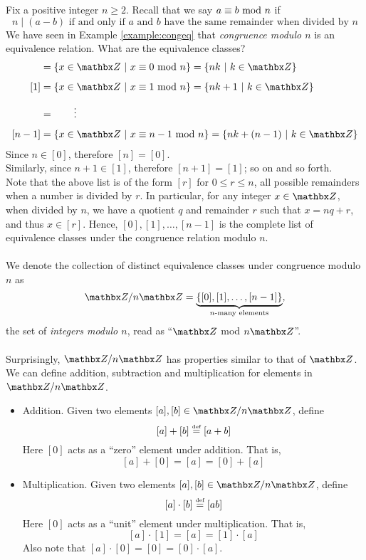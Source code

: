 \begin{discussion}
Fix a positive integer $n \geq 2$. Recall that we say $a \equiv b \text{ mod }{n}$ if 
\[n\mid (a-b) \text{ if and only if $a$ and $b$ have the same remainder when divided by $n$}\]
We have seen in Example \ref{example:congeq} that \emph{congruence modulo $n$} is an equivalence relation. What are the equivalence classes?
\begin{align*}
[0] &= \setp{x \in \zz}{x \equiv 0 \modar{n}} = \setp{nk}{k \in \zz}\\[0.5em]
[1] &= \setp{x \in \zz}{x \equiv 1 \modar{n}} = \setp{nk + 1}{k \in \zz}\\[0.5em]
	&= \qquad \vdots\\[0.5em]
[n-1] &= \setp{x \in \zz}{x \equiv n-1 \modar{n}} = \setp{nk + (n-1)}{k \in \zz}
\end{align*}
Since $n \in [0]$, therefore $[n] = [0]$.\\[0.5em]
Similarly, since $n + 1 \in [1]$, therefore $[n+1] = [1]$; so on and so forth.\\
Note that the above list is of the form $[r]$ for $0 \leq r \leq n$, all possible remainders when a number is divided by $r$. In particular, for any integer $x \in \zz$, when divided by $n$, we have a quotient $q$ and remainder $r$ such that $x = nq + r$, and thus $x \in [r]$. Hence, $[0],[1],\ldots,[n-1]$ is the complete list of equivalence classes under the congruence relation modulo $n$.\\
\\
We denote the collection of distinct equivalence classes under congruence modulo $n$ as
\[\zz/n\zz = \underbrace{\set{[0],[1],\ldots,[n-1]}}_{\text{$n$-many elements}},\]
the set of \emph{integers modulo $n$}, read as ``$\zz$ mod $n\zz$''.\\
\\
Surprisingly, $\zz/n\zz$ has properties similar to that of $\zz$. We can define addition, subtraction and multiplication for elements in $\zz/n\zz$.
\begin{itemize}[leftmargin=*]
\item[]Addition. Given two elements $[a],[b] \in \zz/n\zz$, define
\[ [a] + [b] \overset{\text{\tiny def}}{=} [a+b]\]
Here $[0]$ acts as a ``zero'' element under addition. That is,
\[ [a] + [0] = [a] = [0] + [a]\]

\item[]Multiplication. Given two elements $[a],[b] \in \zz/n\zz$, define
\[ [a] \cdot [b] \overset{\text{\tiny def}}{=} [ab]\]
Here $[0]$ acts as a ``unit'' element under multiplication. That is,
\[ [a] \cdot [1] = [a] = [1] \cdot [a]\]
Also note that $[a] \cdot [0] = [0] = [0] \cdot [a]$.
\end{itemize}
\end{discussion}

